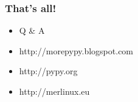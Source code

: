 \documentclass[utf8x, 14pt]{beamer}
\begin{document}
\begin{frame}
  \frametitle{That's all!}
  \begin{itemize}
    \item Q \& A
    \item http://morepypy.blogspot.com
    \item http://pypy.org
    \item http://merlinux.eu
  \end{itemize}
\end{frame}
\end{document}
